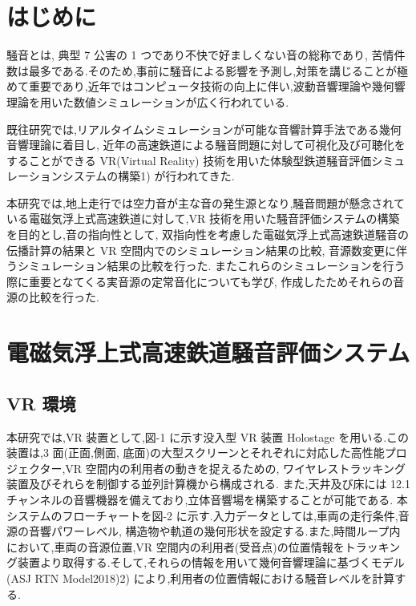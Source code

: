 \documentclass[10pt]{jsarticle}
\begin{document}

\section{はじめに}
騒音とは, 典型 7 公害の 1 つであり不快で好ましくない音の総称であり, 苦情件数は最多である.そのため,事前に騒音による影響を予測し,対策を講じることが極めて重要であり,近年ではコンピュータ技術の向上に伴い,波動音響理論や幾何響理論を用いた数値シミュレーションが広く行われている.

既往研究では,リアルタイムシミュレーションが可能な音響計算手法である幾何音響理論に着目し, 近年の高速鉄道による騒音問題に対して可視化及び可聴化をすることができる VR(Virtual Reality) 技術を用いた体験型鉄道騒音評価シミュレーションシステムの構築1) が行われてきた.

本研究では,地上走行では空力音が主な音の発生源となり,騒音問題が懸念されている電磁気浮上式高速鉄道に対して,VR 技術を用いた騒音評価システムの構築を目的とし,音の指向性として, 双指向性を考慮した電磁気浮上式高速鉄道騒音の伝播計算の結果と VR 空間内でのシミュレーション結果の比較, 音源数変更に伴うシミュレーション結果の比較を行った. またこれらのシミュレーションを行う際に重要となてくる実音源の定常音化についても学び, 作成したためそれらの音源の比較を行った.


\section{電磁気浮上式高速鉄道騒音評価システム}
\subsection{VR 環境}
本研究では,VR 装置として,図-1 に示す没入型 VR 装置 Holostage を用いる.この装置は,3 面(正面,側面, 底面)の大型スクリーンとそれぞれに対応した高性能プロジェクター,VR 空間内の利用者の動きを捉えるための, ワイヤレストラッキング装置及びそれらを制御する並列計算機から構成される. また,天井及び床には 12.1 チャンネルの音響機器を備えており,立体音響場を構築することが可能である.
本システムのフローチャートを図-2 に示す.入力データとしては,車両の走行条件,音源の音響パワーレベル, 構造物や軌道の幾何形状を設定する.また,時間ループ内において,車両の音源位置,VR 空間内の利用者(受音点)の位置情報をトラッキング装置より取得する.そして,それらの情報を用いて幾何音響理論に基づくモデル(ASJ RTN Model2018)2) により,利用者の位置情報における騒音レベルを計算する.
\end{document}
